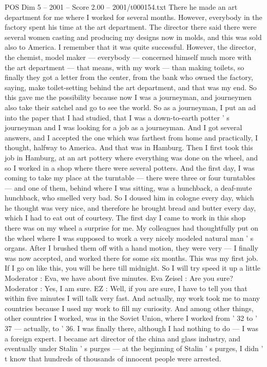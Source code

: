 \begin{textsample}{POS Dim 5 – 2001 – Score 2.00 – 2001/t000154.txt}
There he made an art department for me where I worked for several months.
However, everybody in the factory spent his time at the art department.
The director there said there were several women casting and producing my designs now in molds, and this was sold also to America.
I remember that it was quite successful.
However, the director, the chemist, model maker — everybody — concerned himself much more with the art department — that means, with my work — than making toilets, so finally they got a letter from the center, from the bank who owned the factory, saying, make toilet-setting behind the art department, and that was my end.
So this gave me the possibility because now I was a journeyman, and journeymen also take their satchel and go to see the world.
So as a journeyman, I put an ad into the paper that I had studied, that I was a down-to-earth potter ' s journeyman and I was looking for a job as a journeyman.
And I got several answers, and I accepted the one which was farthest from home and practically, I thought, halfway to America.
And that was in Hamburg.
Then I first took this job in Hamburg, at an art pottery where everything was done on the wheel, and so I worked in a shop where there were several potters.
And the first day, I was coming to take my place at the turntable — there were three or four turntables — and one of them, behind where I was sitting, was a hunchback, a deaf-mute hunchback, who smelled very bad.
So I doused him in cologne every day, which he thought was very nice, and therefore he brought bread and butter every day, which I had to eat out of courtesy.
The first day I came to work in this shop there was on my wheel a surprise for me.
My colleagues had thoughtfully put on the wheel where I was supposed to work a very nicely modeled natural man ' s organs.
After I brushed them off with a hand motion, they were very — I finally was now accepted, and worked there for some six months.
This was my first job.
If I go on like this, you will be here till midnight.
So I will try speed it up a little Moderator : Eva, we have about five minutes.
Eva Zeisel : Are you sure?
Moderator : Yes, I am sure.
EZ : Well, if you are sure, I have to tell you that within five minutes I will talk very fast.
And actually, my work took me to many countries because I used my work to fill my curiosity.
And among other things, other countries I worked, was in the Soviet Union, where I worked from ' 32 to ' 37 — actually, to ' 36.
I was finally there, although I had nothing to do — I was a foreign expert.
I became art director of the china and glass industry, and eventually under Stalin ' s purges — at the beginning of Stalin ' s purges, I didn ' t know that hundreds of thousands of innocent people were arrested.

\end{textsample}
